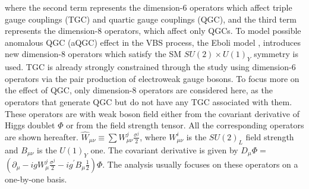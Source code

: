 where the second term represents the dimension-6 operators which affect triple gauge couplings (TGC) and quartic gauge couplings (QGC), and the third term represents the dimension-8 operators, which affect only QGCs.
To model possible anomalous QGC (aQGC) effect in the VBS process, the Eboli model \cite{eboli2006p}, introduces new dimension-8 operators which satisfy the SM $SU(2)\times U(1)_Y$ symmetry is used. TGC is already strongly constrained through the study using dimension-6 operators via the pair production of electroweak gauge bosons. To focus more on the effect of QGC, only dimension-8 operators are considered here, as the operators that generate QGC but do not have any TGC associated with them.
These operators are with weak boson field either from the covariant derivative of Higgs doublet $\Phi$ or from the field strength tensor. 
All the corresponding operators are shown hereafter.
$\hat{W}_{\mu \nu} \equiv \sum W_{\mu \nu}^j \frac{\sigma^j}{2}$, where $W_{\mu \nu}^i$ is the $S U(2)_L$ field strength and $B_{\mu \nu}$ is the $U(1)_Y$ one. The covariant derivative is given by $D_\mu \Phi=$ $\left(\partial_\mu-i g W_\mu^j \frac{\sigma^j}{2}-i g^{\prime} B_\mu \frac{1}{2}\right) \Phi$.
The analysis usually focuses on these operators on a one-by-one basis.
